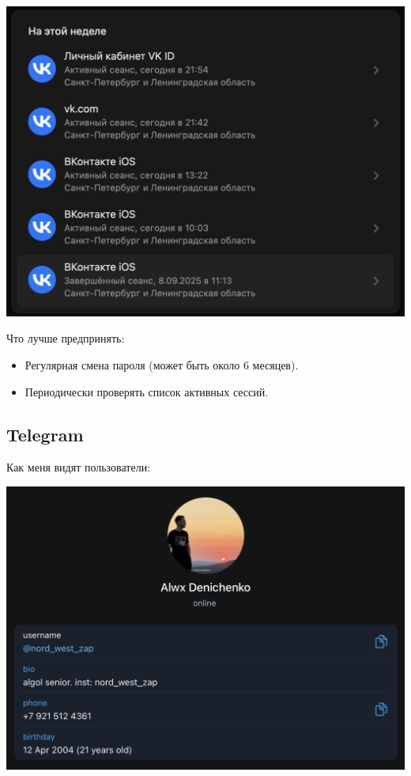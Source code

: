 \documentclass{article}
\begin{document}
\begin{center}
    \includegraphics[width=.9\textwidth]{11}
\end{center}

Что лучше предпринять:

\begin{itemize}
    \item Регулярная смена пароля (может быть около 6 месяцев).
    \item Периодически проверять список активных сессий.
\end{itemize}

\subsection{Telegram}

Как меня видят пользователи:

\begin{center}
    \includegraphics[width=.9\textwidth]{12}
\end{center}
\end{document}
